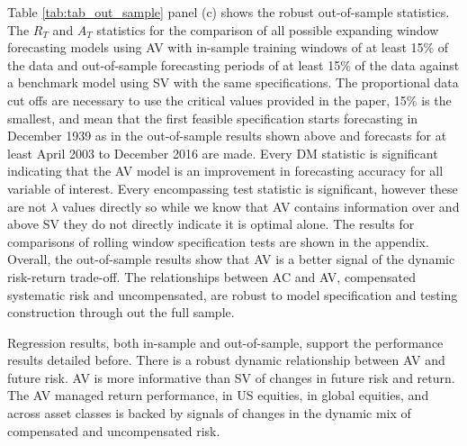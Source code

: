 Table \ref{tab:tab_out_sample} panel (c) shows the robust out-of-sample statistics. The $R_{T}$ and $A_{T}$ statistics for the comparison of all possible expanding window forecasting models using AV with in-sample training windows of at least 15\% of the data and out-of-sample forecasting periods of at least 15\% of the data against a benchmark model using SV with the same specifications. The proportional data cut offs are necessary to use the critical values provided in the \citet{rossi_out--sample_2012} paper, 15\% is the smallest, and mean that the first feasible specification starts forecasting in December 1939 as in the out-of-sample results shown above and forecasts for at least April 2003 to December 2016 are made. Every DM statistic is significant indicating that the AV model is an improvement in forecasting accuracy for all variable of interest. Every encompassing test statistic is significant, however these are not $\lambda$ values directly so while we know that AV contains information over and above SV they do not directly indicate it is optimal alone. The results for comparisons of rolling window specification tests are shown in the appendix. Overall, the out-of-sample results show that AV is a better signal of the dynamic risk-return trade-off. The relationships between AC and AV, compensated systematic risk and uncompensated, are robust to model specification and testing construction through out the full sample.

Regression results, both in-sample and out-of-sample, support the performance results detailed before. There is a robust dynamic relationship between AV and future risk. AV is more informative than SV of changes in future risk and return. The AV managed return performance, in US equities, in global equities, and across asset classes is backed by signals of changes in the dynamic mix of compensated and uncompensated risk.